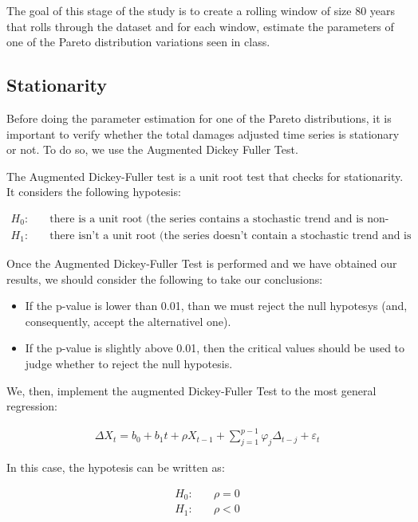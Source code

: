 \documentclass[paper=a4, fontsize=11pt]{scrartcl} %
\begin{document}
The goal of this stage of the study is to create a rolling window of size 80 years that rolls through the dataset and for each window, estimate the parameters of one of the Pareto distribution variations seen in class.

\subsection{Stationarity}

Before doing the parameter estimation for one of the Pareto distributions, it is important to verify whether the total damages adjusted time series is stationary or not. To do so, we use the Augmented Dickey Fuller Test.

The Augmented Dickey-Fuller test is a unit root test that checks for stationarity. It considers the following hypotesis:

\begin{align*}
    H_0: & \quad \text{there is a unit root (the series contains a stochastic trend and is non-stationary)} \\
    H_1: & \quad \text{there isn't a unit root (the series doesn't contain a stochastic trend and is stationary)}
\end{align*}

Once the Augmented Dickey-Fuller Test is performed and we have obtained our results, we should consider the following to take our conclusions:

\begin{itemize}
    \item If the p-value is lower than 0.01, than we must reject the null hypotesys (and, consequently, accept the alternativel one).
    \item If the p-value is slightly above 0.01, then the critical values should be used to judge whether to reject the null hypotesis.
\end{itemize}

We, then, implement the augmented Dickey-Fuller Test to the most general regression:

\begin{align*}
    \Delta X_t = b_0 + b_1 t + \rho X_{t-1} + \sum^{p-1}_{j=1} \varphi_j \Delta_{t-j} + \varepsilon_t 
\end{align*}

In this case, the hypotesis can be written as:

\begin{align*}
    H_0: & \quad \rho = 0 \\
    H_1: & \quad \rho < 0
\end{align*}
\end{document}
